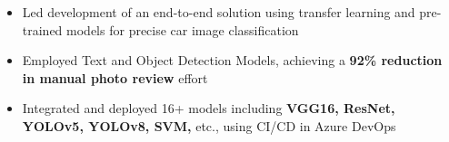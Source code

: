 \documentclass[a4paper,10pt]{article}
\newcommand{\isep}{-2 pt}
\begin{document}
\begin{itemize}
{{\begin{itemize}
        \item Led development of an end-to-end solution using transfer learning and pre-trained models for precise car image classification
        
        \item Employed Text and Object Detection Models, achieving a \textbf{92\% reduction in manual photo review} effort
        
        \item Integrated and deployed 16+ models including \textbf{VGG16, ResNet, YOLOv5, YOLOv8, SVM,} etc., using CI/CD in Azure DevOps
        
        
       
    \end{itemize}

}}
\end{itemize}
\end{document}
